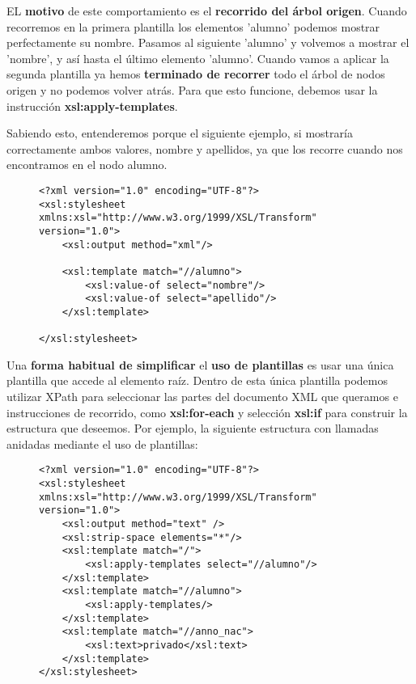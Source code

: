 EL \textbf{motivo} de este comportamiento es el \textbf{recorrido del árbol origen}. Cuando recorremos en la primera plantilla los elementos 'alumno' podemos mostrar perfectamente su nombre. Pasamos al siguiente 'alumno' y volvemos a mostrar el 'nombre', y así hasta el último elemento 'alumno'. Cuando vamos a aplicar la segunda plantilla ya hemos \textbf{terminado de recorrer} todo el árbol de nodos origen y no podemos volver atrás. Para que esto funcione, debemos usar la instrucción \textbf{xsl:apply-templates}.

Sabiendo esto, entenderemos porque el siguiente ejemplo, si mostraría correctamente ambos valores, nombre y apellidos, ya que los recorre cuando nos encontramos en el nodo alumno.

\begin{figure}[H]
    \begin{tcolorbox}[sharp corners, colback=yellow!30, colframe=white!20]
        \scriptsize
\begin{verbatim}
<?xml version="1.0" encoding="UTF-8"?>
<xsl:stylesheet xmlns:xsl="http://www.w3.org/1999/XSL/Transform" version="1.0">
    <xsl:output method="xml"/>

    <xsl:template match="//alumno">
        <xsl:value-of select="nombre"/>
        <xsl:value-of select="apellido"/>
    </xsl:template>

</xsl:stylesheet>
\end{verbatim}
    \end{tcolorbox}
\end{figure}

Una \textbf{forma habitual de simplificar} el \textbf{uso de plantillas} es usar una única plantilla que accede al elemento raíz. Dentro de esta única plantilla podemos utilizar XPath para seleccionar las partes del documento XML que queramos e instrucciones de recorrido, como \textbf{xsl:for-each} y selección \textbf{xsl:if} para construir la estructura que deseemos. Por ejemplo, la siguiente estructura con llamadas anidadas mediante el uso de plantillas:

\begin{figure}[H]
    \begin{tcolorbox}[sharp corners, colback=yellow!30, colframe=white!20]
        \scriptsize
\begin{verbatim}
<?xml version="1.0" encoding="UTF-8"?>
<xsl:stylesheet xmlns:xsl="http://www.w3.org/1999/XSL/Transform" version="1.0">
    <xsl:output method="text" />
    <xsl:strip-space elements="*"/>
    <xsl:template match="/">
        <xsl:apply-templates select="//alumno"/>
    </xsl:template>
    <xsl:template match="//alumno">
        <xsl:apply-templates/>
    </xsl:template>
    <xsl:template match="//anno_nac">
        <xsl:text>privado</xsl:text>
    </xsl:template>
</xsl:stylesheet>
\end{verbatim}
    \end{tcolorbox}
\end{figure}

